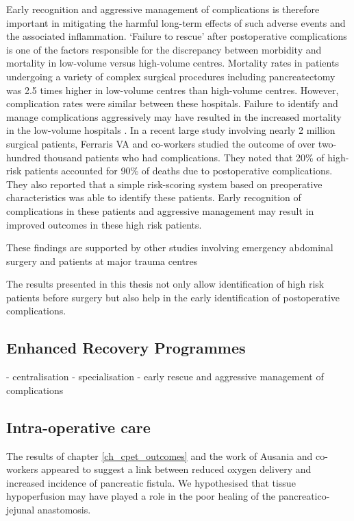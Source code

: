 Early recognition and aggressive management of complications is therefore important in mitigating the harmful long-term effects of such adverse events and the associated inflammation. 
`Failure to rescue' after postoperative complications is one of the factors responsible for the discrepancy between morbidity and mortality in low-volume versus high-volume centres.
Mortality rates in patients undergoing a variety of complex surgical procedures including pancreatectomy was 2.5 times higher in low-volume centres than high-volume centres. 
However, complication rates were similar between these hospitals. 
Failure to identify and manage complications aggressively may have resulted in the increased mortality in the low-volume hospitals \parencite{ghaferi_complications_2009}.
In a recent large study involving nearly 2 million surgical patients, Ferraris VA and co-workers studied the outcome of over two-hundred thousand patients who had complications. 
They noted that 20\% of high-risk patients accounted for 90\% of deaths due to postoperative complications. 
They also reported that a simple risk-scoring system based on preoperative characteristics was able to identify these patients. 
Early recognition of complications in these patients and aggressive management may result in improved outcomes in these high risk patients.

These findings are supported by other studies involving emergency abdominal surgery \parencite{sheetz_improving_2013} and patients at major trauma centres \parencite{haas_prevention_2011}

The results presented in this thesis not only allow identification of high risk patients before surgery but also help in the early identification of postoperative complications. 


\subsection{Enhanced Recovery Programmes}


- centralisation
- specialisation
- early rescue and aggressive management of complications \parencite{gouma_rates_2000}



\subsection{Intra-operative care}

The results of chapter \ref{ch_cpet_outcomes} and the work of Ausania and co-workers appeared to suggest a link between reduced oxygen delivery and increased incidence of pancreatic fistula. 
We hypothesised that tissue hypoperfusion may have played a role in the poor healing of the pancreatico-jejunal anastomosis. 


